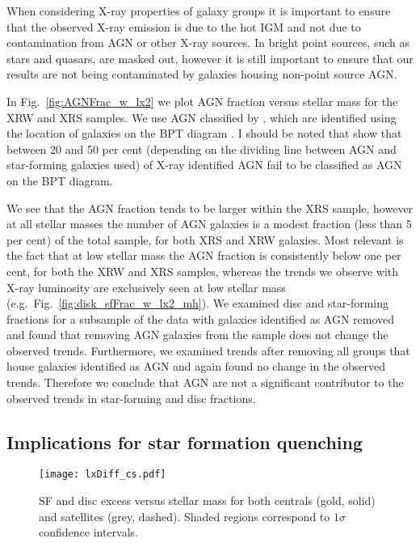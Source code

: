 When considering X-ray properties of galaxy groups it is important to
ensure that the observed X-ray emission is due to the hot IGM and not
due to contamination from AGN or other X-ray sources.  In
\citet{wang2014} bright point sources, such as stars and quasars, are
masked out, however it is still important to ensure that our results
are not being contaminated by galaxies housing non-point source AGN.
\par
In Fig.~\ref{fig:AGNFrac_w_lx2} we plot AGN fraction versus stellar
mass for the XRW and XRS samples.  We use AGN classified by
\citet{kauffmann2003}, which are identified using the location of
galaxies on the BPT diagram \citep{baldwin1981}.  I should be noted
that \citet{trouille2010} show that between 20 and 50 per cent
(depending on the dividing line between AGN and star-forming galaxies
used) of X-ray identified AGN fail to be classified as AGN on the BPT
diagram.
\par
We see that the AGN fraction tends to be larger within the XRS sample,
however at all stellar masses the number of AGN galaxies is a modest
fraction (less than 5 per cent) of the total sample, for both XRS and
XRW galaxies.  Most relevant is the fact that at low stellar mass the
AGN fraction is consistently below one per cent, for both the XRW and
XRS samples, whereas the trends we observe with X-ray luminosity are
exclusively seen at low stellar mass
(e.g.\ Fig.~\ref{fig:disk_sfFrac_w_lx2_mh}).  We examined disc and
star-forming fractions for a subsample of the data with galaxies
identified as AGN removed and found that removing AGN galaxies from
the sample does not change the observed trends.  Furthermore, we
examined trends after removing all groups that house galaxies
identified as AGN and again found no change in the observed trends.
Therefore we conclude that AGN are not a significant contributor to
the observed trends in star-forming and disc fractions.

\subsection{Implications for star formation quenching}

\begin{figure}[!tp]
  \centering
  \texttt{[image: lxDiff\_cs.pdf]}
  \caption{SF and disc excess versus stellar mass for both centrals
    (gold, solid) and satellites (grey, dashed).  Shaded regions
    correspond to $1\sigma$ confidence intervals.}
  \label{fig:lxDiff_cs}
\end{figure}

